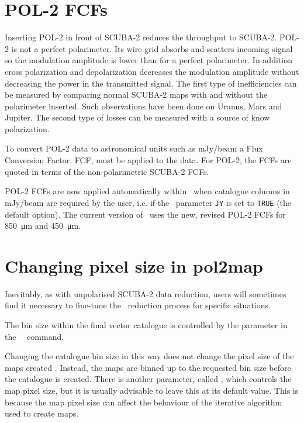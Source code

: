 \section{POL-2 FCFs}
\label{sec:pol2map-fcf}

Inserting POL-2 in front of SCUBA-2 reduces the throughput to SCUBA-2.
POL-2 is not a perfect polarimeter. Its wire grid absorbs and scatters incoming
signal so the modulation amplitude is lower than for a perfect polarimeter.
In addition cross polarization and depolarization decreases the modulation
amplitude without decreasing the power in the transmitted signal. The first
type of inefficiencies can be measured by comparing normal SCUBA-2 maps with
and without the polarimeter inserted. Such observations have been done on Uranus,
Mars and Jupiter. The second type of losses can be measured with a source of know polarization.

To convert POL-2 data to astronomical units such as mJy/beam a Flux Conversion
Factor, FCF, must be applied to the data. For POL-2, the FCFs are quoted in terms of
the non-polarimetric SCUBA-2 FCFs.

POL-2 FCFs are now applied automatically within \poltwomap\ when catalogue columns
in mJy/beam are required by the user, i.e. if the \poltwomap\ parameter \texttt{JY} is set
to \texttt{TRUE} (the default option). The current version of \poltwomap\ uses the new,
revised POL-2 FCFs for \SI{850}{\micro\metre} and \SI{450}{\micro\metre}.

\section{Changing pixel size in pol2map}
\label{sec:pol2map-pixelsize}

Inevitably, as with unpolarised SCUBA-2 data reduction, users will sometimes find it
necessary to fine-tune the \poltwomap\ reduction process for specific situations.

The bin size within the final vector catalogue is controlled by the
 parameter in the \SMURF\ \poltwomap\ command.

\begin{terminalv}
\end{terminalv}

Changing the catalogue bin size in this way does not change the pixel
size of the maps created \poltwomap. Instead, the maps are binned up
to the requested bin size before the catalogue is created. There is
another parameter, called , which controls the map pixel
size, but it is usually advisable to leave this at its default value. This is
because the map pixel size can affect the behaviour of the iterative algorithm
used to create maps.







